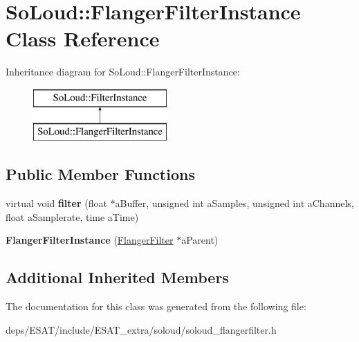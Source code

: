 \hypertarget{class_so_loud_1_1_flanger_filter_instance}{}\section{So\+Loud\+:\+:Flanger\+Filter\+Instance Class Reference}
\label{class_so_loud_1_1_flanger_filter_instance}
Inheritance diagram for So\+Loud\+:\+:Flanger\+Filter\+Instance\+:\begin{figure}[H]
\begin{center}
\leavevmode
\includegraphics[height=2.000000cm]{class_so_loud_1_1_flanger_filter_instance}
\end{center}
\end{figure}
\subsection*{Public Member Functions}
\begin{DoxyCompactItemize}
\item 
\mbox{\label{class_so_loud_1_1_flanger_filter_instance_a9599c24c3a0a917b14bb6da58b3033a6}} 
virtual void {\bfseries filter} (float $\ast$a\+Buffer, unsigned int a\+Samples, unsigned int a\+Channels, float a\+Samplerate, time a\+Time)
\item 
\mbox{\label{class_so_loud_1_1_flanger_filter_instance_acb2cc164d3bbfc69d43ebaeb296502f3}} 
{\bfseries Flanger\+Filter\+Instance} (\mbox{\hyperlink{class_so_loud_1_1_flanger_filter}{Flanger\+Filter}} $\ast$a\+Parent)
\end{DoxyCompactItemize}
\subsection*{Additional Inherited Members}


The documentation for this class was generated from the following file\+:\begin{DoxyCompactItemize}
\item 
deps/\+E\+S\+A\+T/include/\+E\+S\+A\+T\+\_\+extra/soloud/soloud\+\_\+flangerfilter.\+h\end{DoxyCompactItemize}
